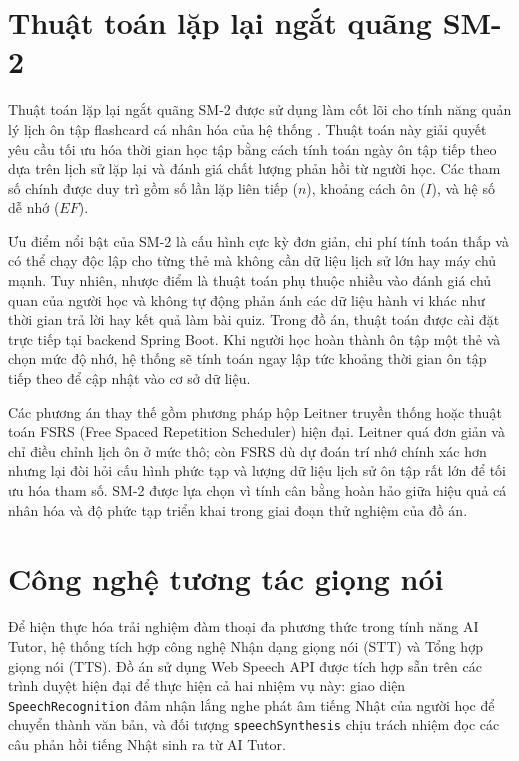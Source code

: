 \documentclass[../DoAn.tex]{subfiles}
\begin{document}
\section{Thuật toán lặp lại ngắt quãng SM-2}
\label{section:3.6}

Thuật toán lặp lại ngắt quãng SM-2 được sử dụng làm cốt lõi cho tính năng quản lý lịch ôn tập flashcard cá nhân hóa của hệ thống \cite{wozniak1990optimization}. Thuật toán này giải quyết yêu cầu tối ưu hóa thời gian học tập bằng cách tính toán ngày ôn tập tiếp theo dựa trên lịch sử lặp lại và đánh giá chất lượng phản hồi từ người học. Các tham số chính được duy trì gồm số lần lặp liên tiếp ($n$), khoảng cách ôn ($I$), và hệ số dễ nhớ ($EF$).

Ưu điểm nổi bật của SM-2 là cấu hình cực kỳ đơn giản, chi phí tính toán thấp và có thể chạy độc lập cho từng thẻ mà không cần dữ liệu lịch sử lớn hay máy chủ mạnh. Tuy nhiên, nhược điểm là thuật toán phụ thuộc nhiều vào đánh giá chủ quan của người học và không tự động phản ánh các dữ liệu hành vi khác như thời gian trả lời hay kết quả làm bài quiz. Trong đồ án, thuật toán được cài đặt trực tiếp tại backend Spring Boot. Khi người học hoàn thành ôn tập một thẻ và chọn mức độ nhớ, hệ thống sẽ tính toán ngay lập tức khoảng thời gian ôn tập tiếp theo để cập nhật vào cơ sở dữ liệu.

Các phương án thay thế gồm phương pháp hộp Leitner truyền thống hoặc thuật toán FSRS (Free Spaced Repetition Scheduler) hiện đại. Leitner quá đơn giản và chỉ điều chỉnh lịch ôn ở mức thô; còn FSRS dù dự đoán trí nhớ chính xác hơn nhưng lại đòi hỏi cấu hình phức tạp và lượng dữ liệu lịch sử ôn tập rất lớn để tối ưu hóa tham số. SM-2 được lựa chọn vì tính cân bằng hoàn hảo giữa hiệu quả cá nhân hóa và độ phức tạp triển khai trong giai đoạn thử nghiệm của đồ án.

\section{Công nghệ tương tác giọng nói}
\label{section:3.7}

Để hiện thực hóa trải nghiệm đàm thoại đa phương thức trong tính năng AI Tutor, hệ thống tích hợp công nghệ Nhận dạng giọng nói (STT) và Tổng hợp giọng nói (TTS). Đồ án sử dụng Web Speech API \cite{web-speech-api} được tích hợp sẵn trên các trình duyệt hiện đại để thực hiện cả hai nhiệm vụ này: giao diện \texttt{SpeechRecognition} đảm nhận lắng nghe phát âm tiếng Nhật của người học để chuyển thành văn bản, và đối tượng \texttt{speechSynthesis} chịu trách nhiệm đọc các câu phản hồi tiếng Nhật sinh ra từ AI Tutor.
\end{document}
